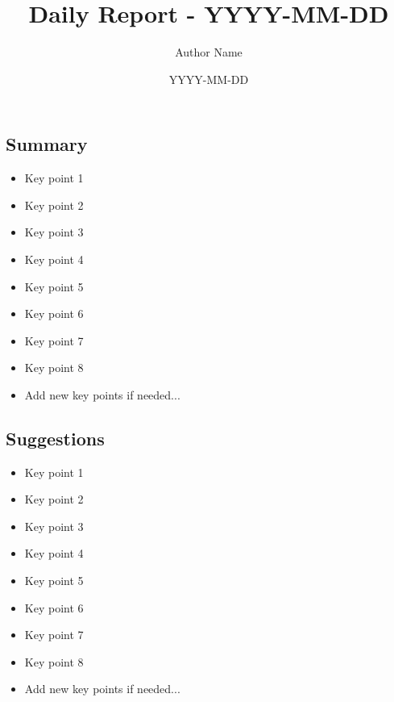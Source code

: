\documentclass[10pt,a4paper]{article}
\title{\vspace{-1cm}\textbf{\LARGE{Daily Report - YYYY-MM-DD}}}
\author{\normalsize{Author Name}}
\date{\normalsize{YYYY-MM-DD}}
\begin{document}
\maketitle

\vspace{1cm}

\begin{multicols}{2}
\section*{Summary}
\begin{itemize}\normalsize
  \item Key point 1
  \item Key point 2
  \item Key point 3
  \item Key point 4
  \item Key point 5
  \item Key point 6
  \item Key point 7
  \item Key point 8
  \item Add new key points if needed...
\end{itemize}
\end{multicols}

\vspace{1cm}

\begin{multicols}{2}
\section*{Suggestions}
\begin{itemize}\normalsize
  \item Key point 1
  \item Key point 2
  \item Key point 3
  \item Key point 4
  \item Key point 5
  \item Key point 6
  \item Key point 7
  \item Key point 8
  \item Add new key points if needed...
\end{itemize}
\end{multicols}

\vspace{1cm}
\end{document}
